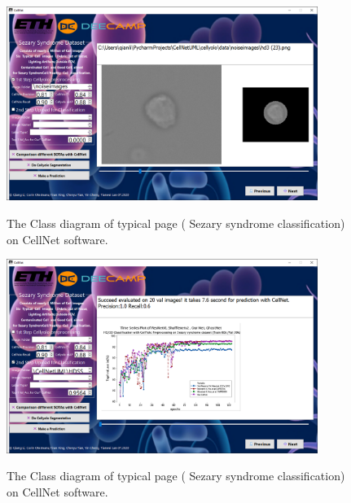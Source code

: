 \begin{figure}[t]
\begin{center}
\includegraphics[height=0.35\textheight,width=0.9\textwidth]{thesis-template-master/images/cellnet5-1page.PNG}
\label{fig:cellnet}
\end{center}
\caption{ The Class diagram of typical page ( Sezary syndrome classification) on CellNet software.}
\end{figure}



\begin{figure}[t]
\begin{center}
\includegraphics[height=0.35\textheight,width=0.9\textwidth]{thesis-template-master/images/cellnet5-2page.PNG}
\label{fig:cellnet}
\end{center}
\caption{ The Class diagram of typical page ( Sezary syndrome classification) on CellNet software. }
\end{figure}


